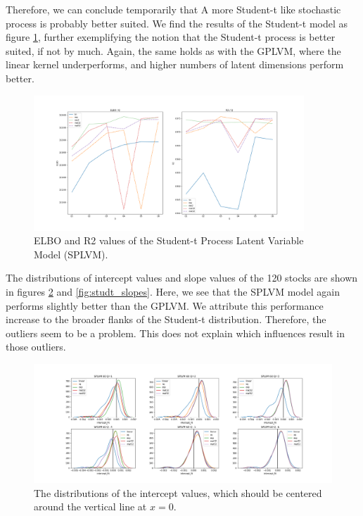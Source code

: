 Therefore, we can conclude temporarily that A more Student-t like stochastic process is probably better suited. We find the results of the Student-t model as figure \ref{fig:studt_ELBO_R2}, further exemplifying the notion that the Student-t process is better suited, if not by much. Again, the same holds as with the GPLVM, where the linear kernel underperforms, and higher numbers of latent dimensions perform better. 
\begin{figure}%
	\centering
	\includegraphics[width=4in]{img/07_1/modelSTUDT_Qs.png}
	\caption[SPLVM ELBO and $R^2$ values for the $N=120$, $D=754$ dataset.]{ELBO and R2 values of the Student-t Process Latent Variable Model (SPLVM).}
	\label{fig:studt_ELBO_R2}
\end{figure}
The distributions of intercept values and slope values of the 120 stocks are shown in figures \ref{fig:studt_intercepts} and \ref{fig:studt_slopes}. Here, we see that the SPLVM model again performs slightly better than the GPLVM. We attribute this performance increase to the broader flanks of the Student-t distribution. Therefore, the outliers seem to be a problem. This does not explain which influences result in those outliers. 
\begin{figure}%
	\centering
	\includegraphics[width=7in]{img/07_1/intercept_fit_studt_120.png}
	\caption[SPLVM intercept values for $N=120$, $D=754$]{The distributions of the intercept values, which should be centered around the vertical line at $x=0$. }
	\label{fig:studt_intercepts}
\end{figure}
